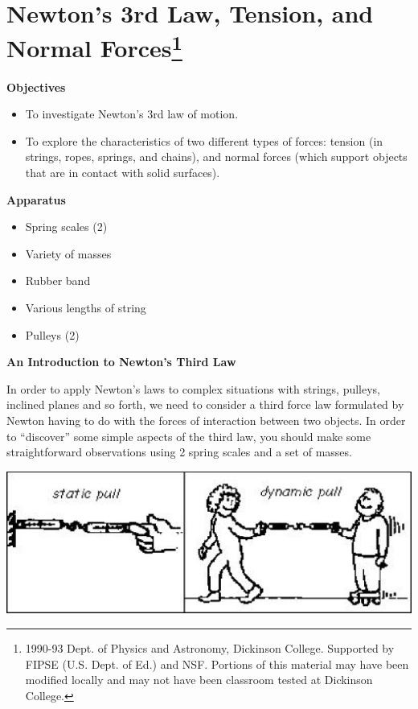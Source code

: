 
\section{Newton's 3rd Law, Tension, and Normal Forces\footnote{
1990-93 Dept. of Physics and Astronomy, Dickinson College. Supported by FIPSE
(U.S. Dept. of Ed.) and NSF. Portions of this material may have been modified
locally and may not have been classroom tested at Dickinson College.
}}

\makelabheader %

\textbf{Objectives }

\begin{itemize}
\item To investigate Newton's 3rd law of motion. 
\item To explore the characteristics of two different types of forces: tension
(in strings, ropes, springs, and chains), and normal forces (which support objects
that are in contact with solid surfaces).
\end{itemize}
\textbf{Apparatus} 

\begin{itemize}
\item Spring scales (2) 
\item Variety of masses 
\item Rubber band 
\item Various lengths of string 
\item Pulleys (2)
\end{itemize}
\textbf{An Introduction to Newton's Third Law }

In order to apply Newton's laws to complex situations with strings, pulleys,
inclined planes and so forth, we need to consider a third force law formulated
by Newton having to do with the forces of interaction between two objects. In
order to ``discover'' some simple aspects of the third law,
you should make some straightforward observations using 2 spring scales and
a set of masses.

\vspace{0.3cm}
{\par\centering \includegraphics{newton/newton_fig1.eps} \par}
\vspace{0.3cm}

